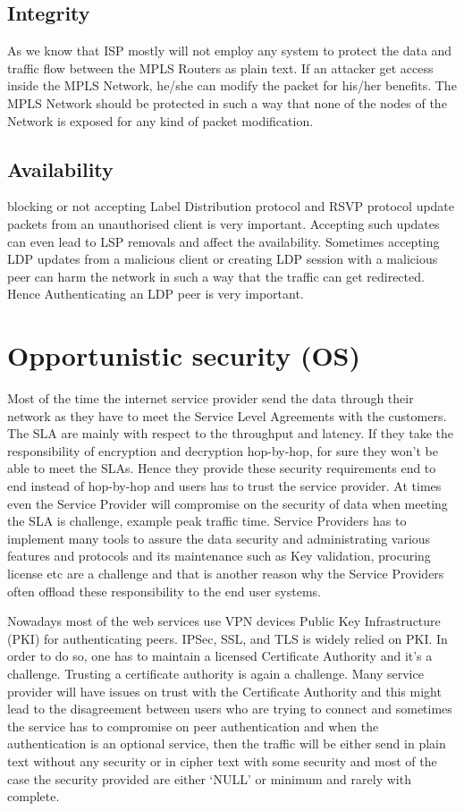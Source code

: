 \subsection{Integrity}

As we know that ISP mostly will not employ any system to protect the data and traffic flow between the MPLS Routers as plain text. If an attacker get access inside the MPLS Network, he/she can modify the packet for his/her benefits. The MPLS Network should be protected in such a way that none of the nodes of the Network is exposed for any kind of packet modification.

\subsection{Availability}

blocking or not accepting Label
Distribution protocol and RSVP protocol update packets from an unauthorised client is very important. Accepting such updates can even lead to LSP removals and affect the availability. Sometimes accepting LDP updates from a malicious client or creating LDP session with a malicious peer can harm the network in such a way that the traffic can get redirected. Hence Authenticating an LDP peer is very important. 


\section{Opportunistic security (OS)}

Most of the time the internet service provider send the data through their network as they have to meet the Service Level Agreements with the customers. The SLA are mainly with respect to the throughput and latency. If they take the responsibility of encryption and decryption hop-by-hop, for sure they won’t be able to meet the SLAs. Hence they provide these security requirements end to end instead of hop-by-hop and users has to trust the service provider. At times even the Service Provider will compromise on the security of data when meeting the SLA is challenge, example peak traffic time. Service Providers has to implement many tools to assure the data security and administrating various features and protocols and its maintenance such as Key validation, procuring license etc are a challenge and that is another reason why the Service Providers often offload these responsibility to the end user systems. 


Nowadays most of the web services use VPN devices Public Key Infrastructure (PKI) for authenticating peers.  IPSec, SSL, and TLS is widely relied on PKI. In order to do so, one has to maintain a licensed Certificate Authority and it’s a challenge. Trusting a certificate authority is again a challenge. Many service provider will have issues on trust with the Certificate Authority and this might lead to the disagreement between users who are trying to connect and sometimes the service has to compromise on peer authentication and when the authentication is an optional service, then the traffic will be either send in plain text without any security or in cipher text with some security and most of the case the security provided are either ‘NULL’ or minimum and rarely with complete.

